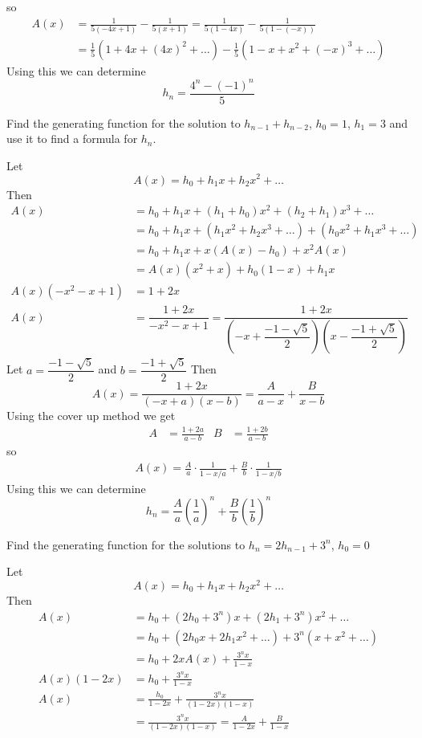 \documentclass[12pt]{article}
\newenvironment{exercise}[2][Exercise]{\begin{trivlist}
\item[\hskip \labelsep {\bfseries #1} \hskip \labelsep {\bfseries #2.}]}{\end{trivlist}}
\begin{document}
so
\begin{align*}
	A(x) &= \frac{1}{5(-4x + 1)} - \frac{1}{5(x + 1)} = \frac{1}{5(1 - 4x)} - \frac{1}{5(1 - (-x))} \\
	     &= \frac{1}{5}(1 + 4x + (4x)^2 + \ldots) - \frac{1}{5}(1 - x + x^2 + (-x)^3 + \ldots)
\end{align*}
Using this we can determine
\[
	h_n = \frac{4^n - (-1)^n}{5}
\]
\begin{exercise}{3.4.5 (2pt)}
	Find the generating function for the solution to $h_{n-1} + h_{n-2}$, $h_0 = 1$, $h_1 = 3$ and use it to find a formula for $h_n$.
\end{exercise}	
Let
\[
	A(x) = h_0 + h_1x + h_2x^2 + \ldots
\]
Then
\begin{align*}
	A(x) &= h_0 + h_1x + (h_1 + h_0)x^2 + (h_2 + h_1)x^3 + \ldots \\
	     &= h_0 + h_1x + (h_1x^2 + h_2x^3 + \ldots) + (h_0x^2 + h_1x^3 + \ldots) \\
	     &= h_0 + h_1x + x(A(x) - h_0) + x^2A(x) \\
	     &= A(x)(x^2 + x) + h_0(1 - x) + h_1x \\
	A(x)(-x^2 - x + 1) &= 1 + 2x \\
	A(x) &= \dfrac{1 + 2x}{-x^2 - x + 1} = \dfrac{1 + 2x}{\left(-x + \dfrac{-1 - \sqrt{5}}{2}\right)\left(x - \dfrac{-1 + \sqrt{5}}{2}\right)}
\end{align*}
Let $a = \dfrac{-1 - \sqrt{5}}{2}$ and $b = \dfrac{-1 + \sqrt{5}}{2}$
Then
\[
	A(x) = \frac{1 + 2x}{(-x + a)(x - b)} = \frac{A}{a - x} + \frac{B}{x - b}
\]
Using the cover up method we get
\begin{align*}
	A &= \frac{1 + 2a}{a - b} & B &= \frac{1 + 2b}{a - b}
\end{align*}
so
\begin{align*}
	A(x) = \frac{A}{a}\cdot\frac{1}{1 - x/a} + \frac{B}{b}\cdot\frac{1}{1 - x/b}
\end{align*}
Using this we can determine
\[
	h_n = \frac{A}{a}\left(\frac{1}{a}\right)^n + \frac{B}{b}\left(\frac{1}{b}\right)^n
\]
\begin{exercise}{3.4.3 (2pt)}
	Find the generating function for the solutions to $h_n = 2h_{n-1} + 3^n$, $h_0 = 0$
\end{exercise}	
Let 
\[
	A(x) = h_0 + h_1x + h_2x^2 + \ldots
\]
Then
\begin{align*}
	A(x) &= h_0 + (2h_0 + 3^n)x + (2h_1 + 3^n)x^2 + \ldots \\
	     &= h_0 + (2h_0x + 2h_1x^2 + \ldots) + 3^n(x + x^2 + \ldots) \\
	     &= h_0 + 2xA(x) + \frac{3^nx}{1-x} \\
	A(x)(1 - 2x) &= h_0 + \frac{3^nx}{1-x} \\
	A(x) &= \frac{h_0}{1 - 2x} + \frac{3^nx}{(1-2x)(1-x)} \\
	     &= \frac{3^nx}{(1-2x)(1-x)} = \frac{A}{1-2x} + \frac{B}{1-x}
\end{align*}
\end{document}

